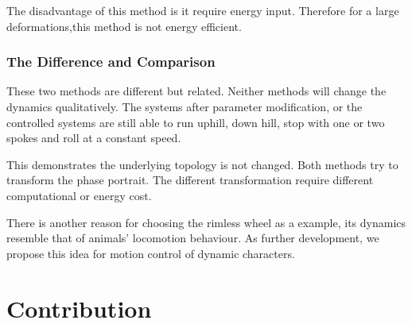 The disadvantage of this method is it require energy input.
Therefore for a large deformations,this method is not energy efficient.

\subsubsection*{The Difference and Comparison}
These two methods are different but related.
Neither methods will change the dynamics qualitatively. 
The systems after parameter modification,  or the controlled systems are still able to run uphill, down hill, stop with one or two spokes and roll at a constant speed.

This demonstrates the underlying topology is not changed.
Both methods try  to transform the phase portrait. 
The different transformation require different computational or energy cost.

There is another reason for choosing the rimless wheel as a example, its dynamics resemble that of animals' locomotion behaviour.
As further development, we propose this idea for motion control of dynamic characters.






\section{Contribution}

